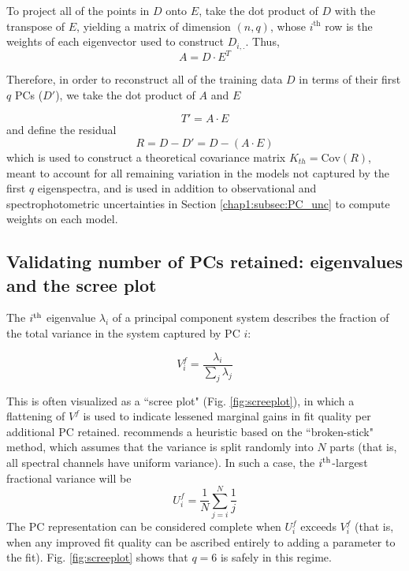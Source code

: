 To project all of the points in $D$ onto $E$, take the dot product of $D$ with the transpose of $E$, yielding a matrix of dimension $(n, q)$, whose $i^{\textrm{th}}$ row is the weights of each eigenvector used to construct $D_{i,.}$. Thus,
\begin{equation}
    A = D \cdot E^T
    \label{eqn:pc_downprojection_simple}
\end{equation}

Therefore, in order to reconstruct all of the training data $D$ in terms of their first $q$ PCs ($D'$), we take the dot product of $A$ and $E$

\begin{equation}
    T' = A \cdot E
\end{equation}
%
and define the residual
%
\begin{equation}
    R = D - D' = D - (A \cdot E)
\end{equation}
%
which is used to construct a theoretical covariance matrix $K_{th} = \textrm{Cov}(R)$, meant to account for all remaining variation in the models not captured by the first $q$ eigenspectra, and is used in addition to observational and spectrophotometric uncertainties in Section \ref{chap1:subsec:PC_unc} to compute weights on each model.

\subsection{Validating number of PCs retained: eigenvalues and the scree plot}
\label{chap1:subsec:picking_q}

The $i^{\rm th}$ eigenvalue $\lambda_i$ of a principal component system describes the fraction of the total variance in the system captured by PC $i$:

\begin{equation}
    V^f_i = \frac{\lambda_i}{\sum_j \lambda_j}
\end{equation}

This is often visualized as a ``scree plot" (Fig. \ref{fig:screeplot}), in which a flattening of $V^f$ is used to indicate lessened marginal gains in fit quality per additional PC retained. \citet{jackson_pca_dim} recommends a heuristic based on the ``broken-stick" method, which assumes that the variance is split randomly into $N$ parts (that is, all spectral channels have uniform variance). In such a case, the $i^{\rm th}$-largest fractional variance will be 
%
\begin{equation}
    U^f_i = \frac{1}{N} \sum_{j=i}^N \frac{1}{j}
\end{equation}
%
The PC representation can be considered complete when $U^f_i$ exceeds $V^f_i$ (that is, when any improved fit quality can be ascribed entirely to adding a parameter to the fit). Fig. \ref{fig:screeplot} shows that $q = 6$ is safely in this regime.

